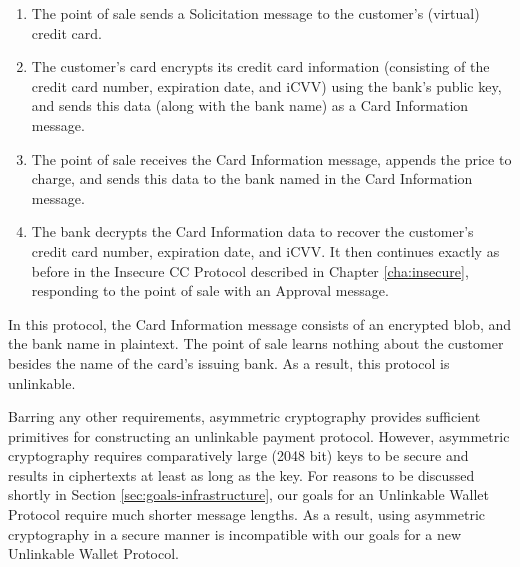 \begin{enumerate}
    \item The point of sale sends a Solicitation message to the customer's (virtual) credit card.
    \item The customer's card encrypts its credit card information (consisting of the credit card number, expiration date, and iCVV) using the bank's public key,
        and sends this data (along with the bank name) as a Card Information message.
    \item The point of sale receives the Card Information message, appends the price to charge, and sends this data to the bank named in the Card Information message.
    \item The bank decrypts the Card Information data to recover the customer's credit card number, expiration date, and iCVV.
        It then continues exactly as before in the Insecure CC Protocol described in Chapter \ref{cha:insecure}, responding to the point of sale with an Approval message.
\end{enumerate}

In this protocol, the Card Information message consists of an encrypted blob, and the bank name in plaintext.
The point of sale learns nothing about the customer besides the name of the card's issuing bank.
As a result, this protocol is unlinkable.

Barring any other requirements, asymmetric cryptography provides sufficient primitives for constructing an unlinkable payment protocol.
However, asymmetric cryptography requires comparatively large (2048 bit) keys to be secure and results in ciphertexts at least as long as the key.
For reasons to be discussed shortly in Section \ref{sec:goals-infrastructure}, our goals for an Unlinkable Wallet Protocol require much shorter message lengths.
As a result, using asymmetric cryptography in a secure manner is incompatible with our goals for a new Unlinkable Wallet Protocol.
